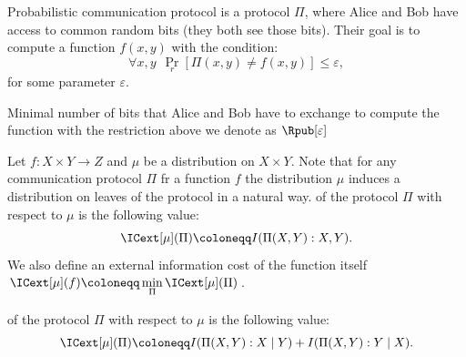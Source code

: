 







\begin{definition*}
     Probabilistic communication protocol is a protocol $\Pi$, where Alice and Bob
    have access to common random bits (they both see those bits). Their goal is to compute a function
    $f(x, y)$ with the condition:
    $$
        \forall x, y ~~ \Pr\limits_{r}[\Pi(x, y) \neq f(x, y)] \le \varepsilon,
    $$
    for some parameter $\varepsilon$.

    Minimal number of bits that Alice and Bob have to exchange to compute the function with the
    restriction above we denote as $\Rpub[\varepsilon]$
\end{definition*}


\begin{definition*}
    Let $f\colon X \times Y \to Z$ and $\mu$ be a distribution on $X \times Y$. Note that for any
    communication protocol $\Pi$ fr a function $f$ the distribution $\mu$ induces a distribution on
    leaves of the protocol in a natural way.  of the protocol $\Pi$
    with respect to $\mu$ is the following value:
    $$
        \ICext[\mu](\Pi) \coloneqq I(\Pi(X, Y) : X, Y).
    $$
    We also define an external information cost of the function itself
    $\ICext[\mu](f) \coloneqq \min\limits_{\Pi} \ICext[\mu](\Pi)$.

     of the protocol $\Pi$ with respect to $\mu$ is the following
    value:
    $$
        \ICext[\mu](\Pi) \coloneqq I(\Pi(X, Y) : X \mid Y) + I(\Pi(X, Y) : Y \mid X).
    $$
\end{definition*}


